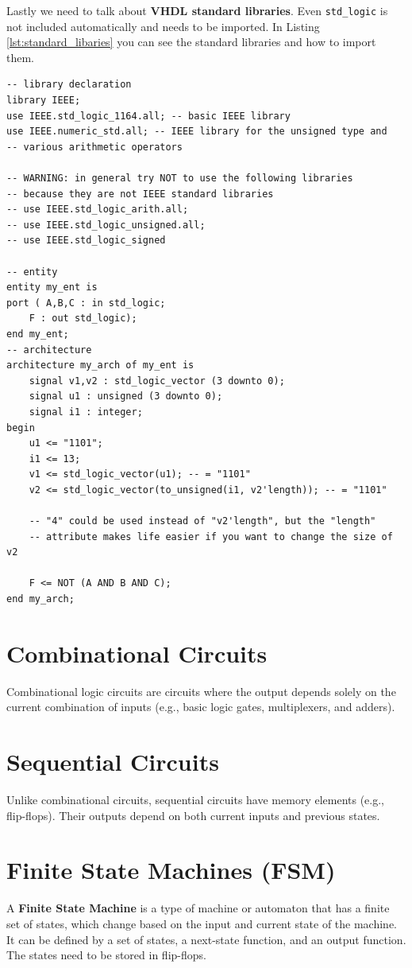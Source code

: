 \documentclass[a4paper,10pt]{IEEEtran}
\begin{document}
Lastly we need to talk about \textbf{VHDL standard libraries}. Even \texttt{std\_logic} is not included automatically and needs to be imported. In Listing \ref{lst:standard_libaries} you can see the standard libraries and how to import them.

\begin{lstlisting}[caption={Example on VHDL Standard Libraries \cite{free-range-vhdl}.}, label={lst:standard_libaries}]
-- library declaration
library IEEE;
use IEEE.std_logic_1164.all; -- basic IEEE library
use IEEE.numeric_std.all; -- IEEE library for the unsigned type and
-- various arithmetic operators

-- WARNING: in general try NOT to use the following libraries
-- because they are not IEEE standard libraries
-- use IEEE.std_logic_arith.all;
-- use IEEE.std_logic_unsigned.all;
-- use IEEE.std_logic_signed

-- entity
entity my_ent is
port ( A,B,C : in std_logic;
    F : out std_logic);
end my_ent;
-- architecture
architecture my_arch of my_ent is
    signal v1,v2 : std_logic_vector (3 downto 0);
    signal u1 : unsigned (3 downto 0);
    signal i1 : integer;
begin
    u1 <= "1101";
    i1 <= 13;
    v1 <= std_logic_vector(u1); -- = "1101"
    v2 <= std_logic_vector(to_unsigned(i1, v2'length)); -- = "1101"

    -- "4" could be used instead of "v2'length", but the "length"
    -- attribute makes life easier if you want to change the size of v2

    F <= NOT (A AND B AND C);
end my_arch;
\end{lstlisting}

\section{Combinational Circuits}
Combinational logic circuits are circuits where the output depends solely on the current combination of inputs (e.g., basic logic gates, multiplexers, and adders).

\section{Sequential Circuits}
Unlike combinational circuits, sequential circuits have memory elements (e.g., flip-flops). Their outputs depend on both current inputs and previous states.

\section{Finite State Machines (FSM)}
A \textbf{Finite State Machine} is a type of machine or automaton that has a finite set of states, which change based on the input and current state of the machine. It can be defined by a set of states, a next-state function, and an output function. The states need to be stored in flip-flops.
\end{document}
